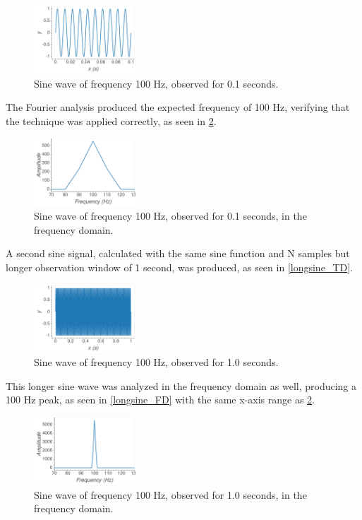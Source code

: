 \documentclass[aps,prl,reprint]{revtex4-2}
\begin{document}
\begin{figure}[h]
\includegraphics[width=0.34\textwidth]{../Images/l5_A_1a.png}
\caption{\label{shortsine_TD} Sine wave of frequency 100 Hz, observed for 0.1 seconds.}
\end{figure}

The Fourier analysis produced the expected frequency of 100 Hz, verifying that
the technique was applied correctly, as seen in \ref{shortsine_FD}. 

\begin{figure}[h]
\includegraphics[width=0.34\textwidth]{../Images/l5_A_1b.png}
\caption{\label{shortsine_FD} Sine wave of frequency 100 Hz, observed for 0.1 seconds, in the frequency domain.}
\end{figure}

A second sine signal, calculated with the same sine function and N samples
but longer observation window of 1 second, was produced, as seen in 
\ref{longsine_TD}.

\begin{figure}[h]
\includegraphics[width=0.34\textwidth]{../Images/l5_A_2a.png}
\caption{\label{shortsine_TD} Sine wave of frequency 100 Hz, observed for 1.0 seconds.}
\end{figure}

This longer sine wave was analyzed in the frequency domain as well, producing
a 100 Hz peak, as seen in \ref{longsine_FD} with the same x-axis range as 
\ref{shortsine_FD}.

\begin{figure}[h]
\includegraphics[width=0.34\textwidth]{../Images/l5_A_2b.png}
\caption{\label{shortsine_TD} Sine wave of frequency 100 Hz, observed for 1.0 seconds, in the frequency domain.}
\end{figure}
\end{document}
